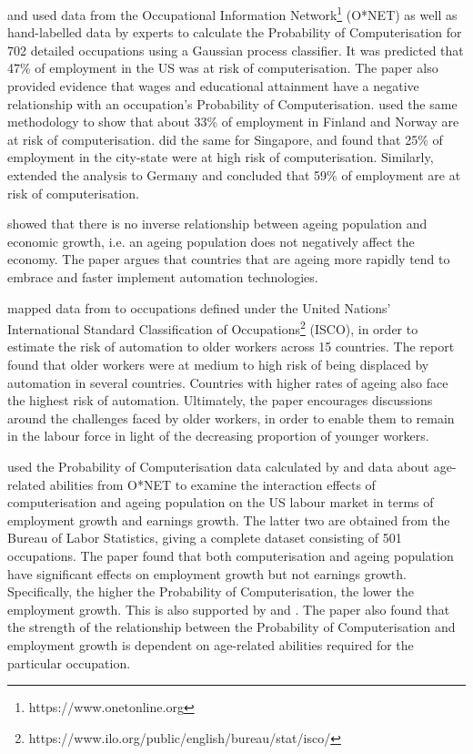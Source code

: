 \documentclass[11pt]{article}
\begin{document}
\cite{futureofemployment} and \cite{osborne2017future} used data from the Occupational Information Network\footnote{https://www.onetonline.org} (O*NET) as well as hand-labelled data by experts to calculate the Probability of Computerisation for 702 detailed occupations using a Gaussian process classifier. It was predicted that 47\% of employment in the US was at risk of computerisation. The paper also provided evidence that wages and educational attainment have a negative relationship with an occupation’s Probability of Computerisation. \cite{pajarinen2015computerization} used the same methodology to show that about 33\% of employment in Finland and Norway are at risk of computerisation. \cite{fuei2017automation} did the same for Singapore, and found that 25\% of employment in the city-state were at high risk of computerisation. Similarly, \cite{brzeski2015roboter} extended the analysis to Germany and concluded that 59\% of employment are at risk of computerisation.

\cite{10.1257/aer.p20171101} showed that there is no inverse relationship between ageing population and economic growth, i.e. an ageing population does not negatively affect the economy. The paper argues that countries that are ageing more rapidly tend to embrace and faster implement automation technologies.

\cite{twinthreats} mapped data from \cite{osborne2017future} to occupations defined under the United Nations' International Standard Classification of Occupations\footnote{https://www.ilo.org/public/english/bureau/stat/isco/} (ISCO), in order to estimate the risk of automation to older workers across 15 countries. The report found that older workers were at medium to high risk of being displaced by automation in several countries. Countries with higher rates of ageing also face the highest risk of automation. Ultimately, the paper encourages discussions around the challenges faced by older workers, in order to enable them to remain in the labour force in light of the decreasing proportion of younger workers.

\cite{10.1371/journal.pone.0263704} used the Probability of Computerisation data calculated by \cite{osborne2017future} and data about age-related abilities from O*NET to examine the interaction effects of computerisation and ageing population on the US labour market in terms of employment growth and earnings growth. The latter two are obtained from the Bureau of Labor Statistics, giving a complete dataset consisting of 501 occupations. The paper found that both computerisation and ageing population have significant effects on employment growth but not earnings growth. Specifically, the higher the Probability of Computerisation, the lower the employment growth. This is also supported by \cite{graetz2018robots} and \cite{acemoglu2020robots}. The paper also found that the strength of the relationship between the Probability of Computerisation and employment  growth is dependent on age-related abilities required for the particular occupation.
\end{document}
